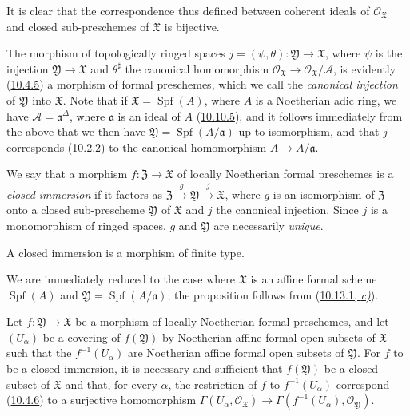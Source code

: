 It is clear that the correspondence thus defined between
coherent ideals of $\mathscr{O}_{\mathfrak{X}}$ and closed sub-preschemes of
$\mathfrak{X}$ is bijective.

The morphism of topologically ringed spaces
$j=(\psi,\theta):\mathfrak{Y}\to\mathfrak{X}$, where $\psi$ is the injection
$\mathfrak{Y}\to\mathfrak{X}$ and $\theta^\sharp$ the canonical homomorphism
$\mathscr{O}_{\mathfrak{X}}\to\mathscr{O}_{\mathfrak{X}}/\mathscr{A}$, is
evidently (\hyperref[I.10.4.5]{10.4.5}) a morphism of formal preschemes,
which we call the \emph{canonical injection} of $\mathfrak{Y}$ into
$\mathfrak{X}$. Note that if $\mathfrak{X}=\operatorname{Spf}(A)$, where $A$
is a Noetherian adic ring, we have $\mathscr{A}=\mathfrak{a}^\Delta$, where
$\mathfrak{a}$ is an ideal of $A$ (\hyperref[I.10.10.5]{10.10.5}), and it
follows immediately from the above that we then have
$\mathfrak{Y}=\operatorname{Spf}(A/\mathfrak{a})$ up to isomorphism, and that
$j$ corresponds (\hyperref[I.10.2.2]{10.2.2}) to the canonical homomorphism
$A\to A/\mathfrak{a}$.

We say that a morphism $f:\mathfrak{Z}\to\mathfrak{X}$ of locally Noetherian
formal preschemes is a \emph{closed immersion} if it factors as
$\mathfrak{Z}\xrightarrow{g}\mathfrak{Y}\xrightarrow{j}\mathfrak{X}$, where $g$
is an isomorphism of $\mathfrak{Z}$ onto a closed sub-prescheme
$\mathfrak{Y}$ of $\mathfrak{X}$ and $j$ the canonical injection. Since $j$ is
a monomorphism of ringed spaces, $g$ and $\mathfrak{Y}$ are necessarily
\emph{unique}.

\begin{proposition}[10.14.3]
\label{I.10.14.3}
A closed immersion is a morphism of finite type.
\end{proposition}

We are immediately reduced to the case where $\mathfrak{X}$ is an affine
formal scheme $\operatorname{Spf}(A)$ and
$\mathfrak{Y}=\operatorname{Spf}(A/\mathfrak{a})$;
the proposition follows from (\hyperref[I.10.13.1]{10.13.1, \emph{c)}}).

\begin{lemma}[10.14.4]
\label{I.10.14.4}
Let $f:\mathfrak{Y}\to\mathfrak{X}$ be a morphism of locally Noetherian
formal preschemes, and let $(U_\alpha)$ be a covering of
$f(\mathfrak{Y})$ by Noetherian affine formal open subsets of
$\mathfrak{X}$ such that the $f^{-1}(U_\alpha)$ are Noetherian affine formal
open subsets of $\mathfrak{Y}$. For $f$ to be a closed immersion,
it is necessary and sufficient that $f(\mathfrak{Y})$ be a closed subset of
$\mathfrak{X}$ and that, for every $\alpha$, the restriction of $f$ to
$f^{-1}(U_\alpha)$ correspond \textup{(\hyperref[I.10.4.6]{10.4.6})} to a
surjective homomorphism
$\Gamma(U_\alpha,\mathscr{O}_{\mathfrak{X}})\to
\Gamma(f^{-1}(U_\alpha),\mathscr{O}_{\mathfrak{Y}})$.
\end{lemma}

